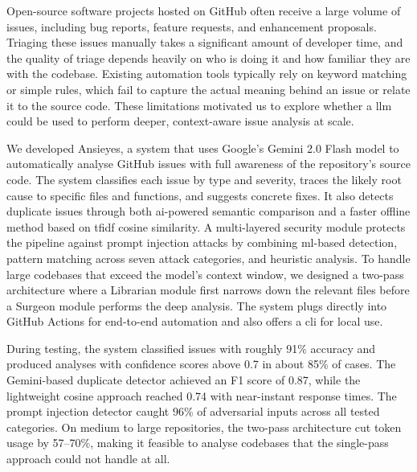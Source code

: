 \vspace{-1cm}
Open-source software projects hosted on GitHub often receive a large volume of issues, including bug reports, feature requests, and enhancement proposals. Triaging these issues manually takes a significant amount of developer time, and the quality of triage depends heavily on who is doing it and how familiar they are with the codebase. Existing automation tools typically rely on keyword matching or simple rules, which fail to capture the actual meaning behind an issue or relate it to the source code. These limitations motivated us to explore whether a \gls{llm} could be used to perform deeper, context-aware issue analysis at scale.

We developed Ansieyes, a system that uses Google's Gemini 2.0 Flash model to automatically analyse GitHub issues with full awareness of the repository's source code. The system classifies each issue by type and severity, traces the likely root cause to specific files and functions, and suggests concrete fixes. It also detects duplicate issues through both \gls{ai}-powered semantic comparison and a faster offline method based on \gls{tfidf} cosine similarity. A multi-layered security module protects the pipeline against prompt injection attacks by combining \gls{ml}-based detection, pattern matching across seven attack categories, and heuristic analysis. To handle large codebases that exceed the model's context window, we designed a two-pass architecture where a Librarian module first narrows down the relevant files before a Surgeon module performs the deep analysis. The system plugs directly into GitHub Actions for end-to-end automation and also offers a \gls{cli} for local use.

During testing, the system classified issues with roughly 91\% accuracy and produced analyses with confidence scores above 0.7 in about 85\% of cases. The Gemini-based duplicate detector achieved an F1 score of 0.87, while the lightweight cosine approach reached 0.74 with near-instant response times. The prompt injection detector caught 96\% of adversarial inputs across all tested categories. On medium to large repositories, the two-pass architecture cut token usage by 57--70\%, making it feasible to analyse codebases that the single-pass approach could not handle at all.

\pagebreak
